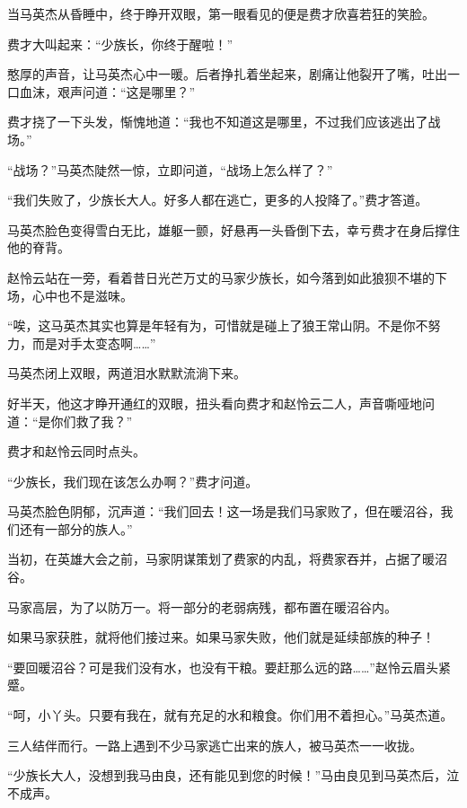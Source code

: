 
\begin{this_body}



当马英杰从昏睡中，终于睁开双眼，第一眼看见的便是费才欣喜若狂的笑脸。

费才大叫起来：“少族长，你终于醒啦！”

憨厚的声音，让马英杰心中一暖。后者挣扎着坐起来，剧痛让他裂开了嘴，吐出一口血沫，艰声问道：“这是哪里？”

费才挠了一下头发，惭愧地道：“我也不知道这是哪里，不过我们应该逃出了战场。”

“战场？”马英杰陡然一惊，立即问道，“战场上怎么样了？”

“我们失败了，少族长大人。好多人都在逃亡，更多的人投降了。”费才答道。

马英杰脸色变得雪白无比，雄躯一颤，好悬再一头昏倒下去，幸亏费才在身后撑住他的脊背。

赵怜云站在一旁，看着昔日光芒万丈的马家少族长，如今落到如此狼狈不堪的下场，心中也不是滋味。

“唉，这马英杰其实也算是年轻有为，可惜就是碰上了狼王常山阴。不是你不努力，而是对手太变态啊……”

马英杰闭上双眼，两道泪水默默流淌下来。

好半天，他这才睁开通红的双眼，扭头看向费才和赵怜云二人，声音嘶哑地问道：“是你们救了我？”

费才和赵怜云同时点头。

“少族长，我们现在该怎么办啊？”费才问道。

马英杰脸色阴郁，沉声道：“我们回去！这一场是我们马家败了，但在暖沼谷，我们还有一部分的族人。”

当初，在英雄大会之前，马家阴谋策划了费家的内乱，将费家吞并，占据了暖沼谷。

马家高层，为了以防万一。将一部分的老弱病残，都布置在暖沼谷内。

如果马家获胜，就将他们接过来。如果马家失败，他们就是延续部族的种子！

“要回暖沼谷？可是我们没有水，也没有干粮。要赶那么远的路……”赵怜云眉头紧蹙。

“呵，小丫头。只要有我在，就有充足的水和粮食。你们用不着担心。”马英杰道。

三人结伴而行。一路上遇到不少马家逃亡出来的族人，被马英杰一一收拢。

“少族长大人，没想到我马由良，还有能见到您的时候！”马由良见到马英杰后，泣不成声。


\end{this_body}
